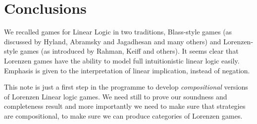 \documentclass{article}
\begin{document}

 \section*{Conclusions}
 We recalled games for Linear Logic in two traditions, Blass-style games (as discussed by  Hyland, Abramsky and Jagadhesan and many others) and Lorenzen-style games (as introduced by Rahman, Keiff and others). It seems clear that Lorenzen games have the ability to model full intuitionistic linear logic easily. Emphasis is given to the interpretation of linear implication, instead of negation. 
 
 This note is just a first step in the programme to develop {\em compositional} versions of Lorenzen Linear logic games. We need still to prove our soundness and completeness result and more importantly we need to make sure that strategies are compositional, to make sure we can produce categories of Lorenzen games.



%
%


\end{document}
